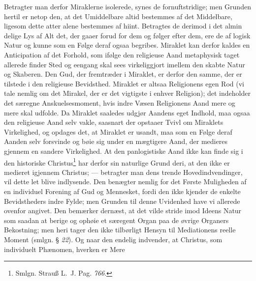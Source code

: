 \documentclass[12pt]{book}
\newcommand{\opage}[1]{\marginnote{\footnotesize\textit{[#1]}}}
\begin{document}
Betragter man derfor Miraklerne isolerede, synes de fornuftstridige; men Grunden
hertil er netop den, at det Umiddelbare altid bestemmes af det Middelbare,
ligesom dette atter alene bestemmes af hiint. Betragtes de derimod i det almin\-%
\opage{152}\setcounter{footnote}{0}%
delige Lys af Alt det, der gaaer forud for dem og følger efter dem, ere de af
logisk Natur og kunne som en Følge deraf ogsaa begribes. Miraklet kan derfor
kaldes en Anticipation af det Forhold, som ifølge den religieuse Aand
metaphysisk taget allerede finder Sted og eengang skal sees virkeliggjort imellem
den skabte Natur og Skaberen. Den Gud, der fremtræder i Miraklet, er derfor den
samme, der er tilstede i den religieuse Bevidsthed. Miraklet er altsaa
Religionens egen Rod (vi tale nemlig om det Mirakel, der er det vigtigste i
enhver Religion); det indeholder det særegne Anskuelsesmoment, hvis indre Væsen
Religionens Aand mere og mere skal udfolde. Da Miraklet saaledes udgjør Aandens
eget Indhold, maa ogsaa den religieuse Aand selv vakle, saasnart der opstaaer
Tvivl om Miraklets Virkelighed, og opdages det, at Miraklet er usandt, maa som en
Følge deraf Aanden selv forsvinde og bøie sig under en mægtigere Aand, der
medieres gjennem en sandere Virkelighed. At den panlogistiske Aand ikke kan finde
sig i den historiske Christus\footnote{Smlgn. Strauß L.~J. Pag. \textit{766}.}
har derfor sin naturlige Grund deri, at den ikke er medieret igjennem Christus;
--- betragter man dens trende Hovedindvendinger, vil dette let blive indlysende.
Den benægter nemlig for det Første Muligheden af en individuel Forening af Gud og
Mennesket, fordi den ikke kjender de enkelte Bevidstheders indre Fylde; men
Grunden til denne Uvidenhed have vi allerede ovenfor angivet. Den bemærker
dernæst, at det vilde stride imod Ideens Natur som saadan at berige og ophøie et
særegent Organ paa de øvrige Organers Bekostning; men heri tager den ikke
tilbørligt Hensyn til Mediationens reelle Moment (smlgn. § \textit{22}). Og naar
den endelig indvender, at Christus, som individuelt Phænomen, hverken er Mere
\end{document}
